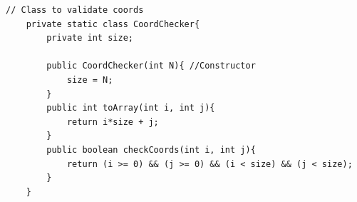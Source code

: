\documentclass{article}
\begin{document}
\begin{lstlisting}[caption=Coordinate checker nested class, label=code:coord]
    // Class to validate coords
    private static class CoordChecker{
        private int size;

        public CoordChecker(int N){ //Constructor
            size = N;
        }
        public int toArray(int i, int j){
            return i*size + j;
        }
        public boolean checkCoords(int i, int j){
            return (i >= 0) && (j >= 0) && (i < size) && (j < size);
        }
    }
\end{lstlisting}
\end{document}
